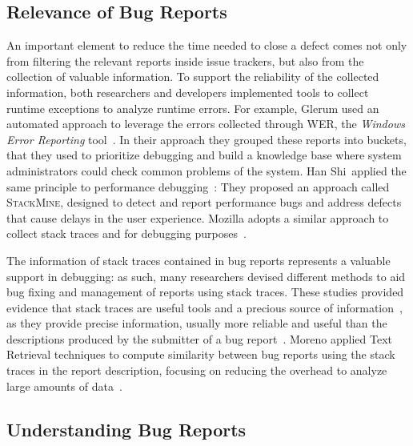 \subsection{Relevance of Bug Reports}

An important element to reduce the time needed to close a defect comes not only from filtering the relevant reports inside issue trackers, but also from the collection of valuable information.
To support the reliability of the collected information, both researchers and developers implemented tools to collect runtime exceptions to analyze runtime errors. For example, Glerum \etal used an automated approach to leverage the errors collected through WER, the \emph{Windows Error Reporting} tool~\cite{Glerum2009}. In their approach they grouped these reports into buckets, that they used to prioritize debugging and build a knowledge base where system administrators could check common problems of the system. Han Shi~\etal applied the same principle to performance debugging~\cite{Han2012}: They proposed an approach called \textsc{StackMine}, designed to detect and report performance bugs and address defects that cause delays in the user experience. Mozilla adopts a similar approach to collect stack traces and for debugging purposes~\cite{McLa2004}.

The information of stack traces contained in bug reports represents a valuable support in debugging: as such, many researchers devised different methods to aid bug fixing and management of reports using stack traces. These studies provided evidence that stack traces are useful tools and a precious source of information~\cite{Davie2013,Wang2013,Brod2005,Weis2007a}, as they provide precise information, usually more reliable and useful than the descriptions produced by the submitter of a bug report~\cite{Ko2006}. Moreno \etal applied Text Retrieval techniques to compute similarity between bug reports using the stack traces in the report description, focusing on reducing the overhead to analyze large amounts of data~\cite{Moreno2014}.




\subsection{Understanding Bug Reports}

